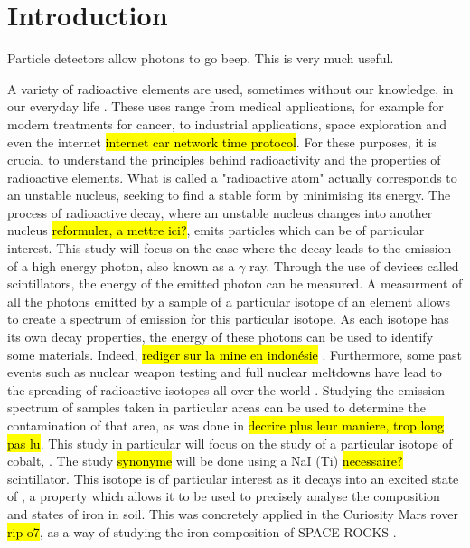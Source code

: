 \section{Introduction}
Particle detectors allow photons to go beep.
This is very much useful.

A variety of radioactive elements are used, sometimes without our knowledge, in our everyday life \cite{my_ass}. These uses range from medical applications, for example for modern treatments for cancer, to industrial applications, space exploration and even the internet \hl{internet car network time protocol}. For these purposes, it is crucial to understand the principles behind radioactivity and the properties of radioactive elements. What is called a "radioactive atom" actually corresponds to an unstable nucleus, seeking to find a stable form by minimising its energy. The process of radioactive decay, where an unstable nucleus changes into another nucleus \hl{reformuler, a mettre ici?}, emits particles which can be of particular interest. This study will focus on the case where the decay leads to the emission of a high energy photon, also known as a \(\gamma\) ray. Through the use of devices called scintillators, the energy of the emitted photon can be measured. A measurment of all the photons emitted by a sample of a particular isotope of an element allows to create a spectrum of emission for this particular isotope. As each isotope has its own decay properties, the energy of these photons can be used to identify some materials. Indeed, \hl{rediger sur la mine en indonésie} \cite{ramadhany_assessment_2022}. Furthermore, some past events such as nuclear weapon testing and full nuclear meltdowns have lead to the spreading of radioactive isotopes all over the world \cite{my_ass}. Studying the emission spectrum of samples taken in particular areas can be used to determine the contamination of that area, as was done in \cite{varley_situ_2017} \hl{decrire plus leur maniere, trop long pas lu}. This study in particular will focus on the study of a particular isotope of cobalt, \cobalt. The study \hl{synonyme} will be done using a NaI (Ti) \hl{necessaire?} scintillator. This isotope is of particular interest as it decays into an excited state of \iron, a property which allows it to be used to precisely analyse the composition and states of iron in soil. This was concretely applied in the Curiosity Mars rover \hl{rip o7}, as a way of studying the iron composition of SPACE ROCKS \cite{my_ass}.

